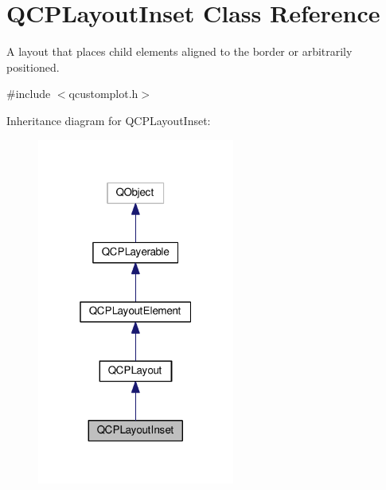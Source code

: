 \hypertarget{classQCPLayoutInset}{}\section{Q\+C\+P\+Layout\+Inset Class Reference}
\label{classQCPLayoutInset}


A layout that places child elements aligned to the border or arbitrarily positioned.  




{\ttfamily \#include $<$qcustomplot.\+h$>$}



Inheritance diagram for Q\+C\+P\+Layout\+Inset\+:
\nopagebreak
\begin{figure}[H]
\begin{center}
\leavevmode
\includegraphics[width=184pt]{classQCPLayoutInset__inherit__graph}
\end{center}
\end{figure}


